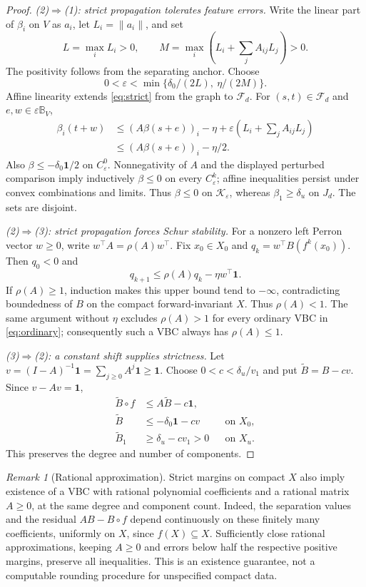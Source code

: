 \documentclass[journal,10pt]{IEEEtran}
\theoremstyle{definition}\newtheorem{definition}{Definition}
\theoremstyle{remark}
\newtheorem*{remark}{Remark}
\newcommand{\one}{\mathbf 1}
\newcommand{\ball}{\mathbb B_V}
\newcommand{\F}{\mathcal F_d}
\begin{document}
\begin{proof}
\emph{(2)$\Rightarrow$(1): strict propagation tolerates feature errors.}
Write the linear part of $\beta_i$ on $V$ as $a_i$, let $L_i=\|a_i\|$, and set
\[
 L=\max_i L_i>0,\qquad
 M=\max_i\left(L_i+\sum_j A_{ij}L_j\right)>0.
\]
The positivity follows from the separating anchor. Choose
\[
 0<\varepsilon<\min\{\delta_0/(2L),\ \eta/(2M)\}.
\]
Affine linearity extends \eqref{eq:strict} from the graph to $\F$. For $(s,t)\in\F$ and $e,w\in\varepsilon\ball$,
\begin{align*}
 \beta_i(t+w)
 &\leq (A\beta(s+e))_i-\eta
       +\varepsilon\left(L_i+\sum_j A_{ij}L_j\right)\\
 &\leq (A\beta(s+e))_i-\eta/2.
\end{align*}
Also $\beta\leq-\delta_0\one/2$ on $C_\varepsilon^0$. Nonnegativity of $A$ and the displayed perturbed comparison imply inductively $\beta\leq0$ on every $C_\varepsilon^k$; affine inequalities persist under convex combinations and limits. Thus $\beta\leq0$ on $\mathcal K_\varepsilon$, whereas $\beta_1\geq\delta_u$ on $J_d$. The sets are disjoint.

\emph{(2)$\Rightarrow$(3): strict propagation forces Schur stability.}
For a nonzero left Perron vector $w\geq0$, write $w^\top A=\rho(A)w^\top$. Fix $x_0\in X_0$ and $q_k=w^\top B(f^k(x_0))$. Then $q_0<0$ and
\[
 q_{k+1}\leq\rho(A)q_k-\eta w^\top\one.
\]
If $\rho(A)\geq1$, induction makes this upper bound tend to $-\infty$, contradicting boundedness of $B$ on the compact forward-invariant $X$. Thus $\rho(A)<1$. The same argument without $\eta$ excludes $\rho(A)>1$ for every ordinary VBC in \eqref{eq:ordinary}; consequently such a VBC always has $\rho(A)\leq1$.

\emph{(3)$\Rightarrow$(2): a constant shift supplies strictness.}
Let $v=(I-A)^{-1}\one=\sum_{j\geq0}A^j\one\geq\one$. Choose $0<c<\delta_u/v_1$ and put $\widetilde B=B-cv$. Since $v-Av=\one$,
\[
\begin{aligned}
 \widetilde B\circ f&\leq A\widetilde B-c\one,\\
 \widetilde B&\leq-\delta_0\one-cv &&\text{on }X_0,\\
 \widetilde B_1&\geq\delta_u-cv_1>0 &&\text{on }X_u.
\end{aligned}
\]
This preserves the degree and number of components.
\end{proof}

\begin{remark}[Rational approximation]
Strict margins on compact $X$ also imply existence of a VBC with rational polynomial coefficients and a rational matrix $A\geq0$, at the same degree and component count. Indeed, the separation values and the residual $AB-B\circ f$ depend continuously on these finitely many coefficients, uniformly on $X$, since $f(X)\subseteq X$. Sufficiently close rational approximations, keeping $A\geq0$ and errors below half the respective positive margins, preserve all inequalities. This is an existence guarantee, not a computable rounding procedure for unspecified compact data.
\end{remark}
\end{document}
